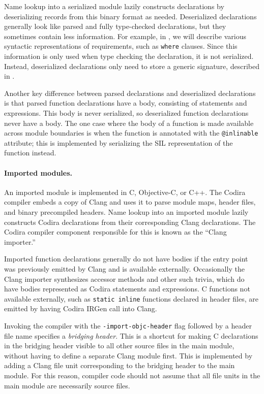 \documentclass[../generics]{subfiles}
\begin{document}
Name lookup into a serialized module lazily constructs declarations by deserializing records from this binary format as needed. Deserialized declarations generally look like parsed and fully type-checked declarations, but they sometimes contain less information. For example, in , we will describe various syntactic representations of requirements, such as \texttt{where} clauses. Since this information is only used when type checking the declaration, it is not serialized. Instead, deserialized declarations only need to store a generic signature, described in .

Another key difference between parsed declarations and deserialized declarations is that parsed function declarations have a body, consisting of statements and expressions. This body is never serialized, so deserialized function declarations never have a body. The one case where the body of a function is made available across module boundaries is when the function is annotated with the \texttt{@inlinable} attribute; this is implemented by serializing the SIL representation of the function instead.

\paragraph{Imported modules.} An imported module is implemented in C, Objective-C, or C++. The Codira compiler embeds a copy of Clang and uses it to parse module maps, header files, and binary precompiled headers. Name lookup into an imported module lazily constructs Codira declarations from their corresponding Clang declarations. The Codira compiler component responsible for this is known as the ``Clang importer.''

Imported function declarations generally do not have bodies if the entry point was previously emitted by Clang and is available externally. Occasionally the Clang importer synthesizes accessor methods and other such trivia, which do have bodies represented as Codira statements and expressions. C functions not available externally, such as \texttt{static inline} functions declared in header files, are emitted by having Codira IRGen call into Clang.

Invoking the compiler with the \texttt{-import-objc-header} flag followed by a header file name specifies a \emph{bridging header}. This is a shortcut for making C declarations in the bridging header visible to all other source files in the main module, without having to define a separate Clang module first. This is implemented by adding a Clang file unit corresponding to the bridging header to the main module. For this reason, compiler code should not assume that all file units in the main module are necessarily source files.
\end{document}
